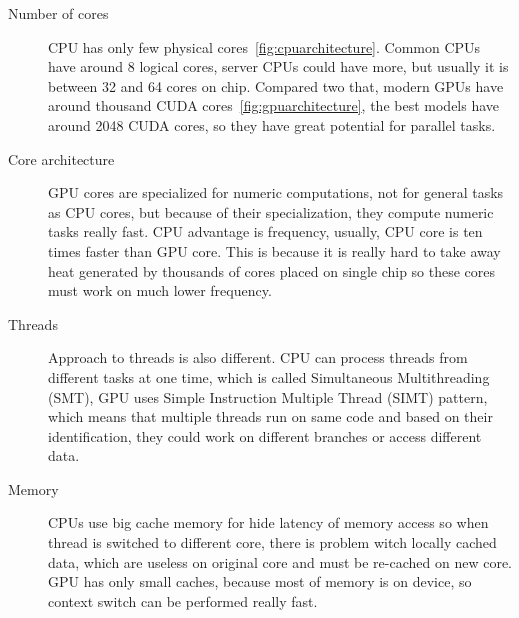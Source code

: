 \begin{description}
\item[Number of cores] CPU has only few physical cores~\autoref{fig:cpuarchitecture}. Common CPUs have around 8 logical cores, server CPUs could have more, but usually it is between 32 and 64 cores on chip. Compared two that, modern GPUs have around thousand CUDA cores~\autoref{fig:gpuarchitecture}, the best models have around 2048 CUDA cores, so they have great potential for parallel tasks.
\item[Core architecture] GPU cores are specialized for numeric computations, not for general tasks as CPU cores, but because of their specialization, they compute numeric tasks really fast. CPU advantage is frequency, usually, CPU core is ten times faster than GPU core. This is because it is really hard to take away heat generated by thousands of cores placed on single chip so these cores must work on much lower frequency.
\item[Threads] Approach to threads is also different. CPU can process threads from different tasks at one time, which is called Simultaneous Multithreading (SMT), GPU uses Simple Instruction Multiple Thread (SIMT) pattern, which means that multiple threads run on same code and based on their identification, they could work on different branches or access different data.
\item[Memory] CPUs use big cache memory for hide latency of memory access so when thread is switched to different core, there is problem witch locally cached data, which are useless on original core and must be re-cached on new core. GPU has only small caches, because most of memory is on device, so context switch can be performed really fast.


\end{description}
